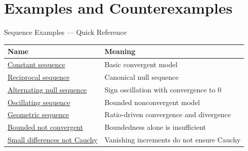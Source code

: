 \section{Examples and Counterexamples}

\begin{toolkitbox}{Sequence Examples --- Quick Reference}
\small
\begin{tabular}{l l}
\toprule
\textbf{Name} & \textbf{Meaning} \\
\midrule
\hyperref[ex:sequence-example-constant]{Constant sequence} & Basic convergent model \\
\hyperref[ex:sequence-example-reciprocal]{Reciprocal sequence} & Canonical null sequence \\
\hyperref[ex:sequence-example-alternating-null]{Alternating null sequence} & Sign oscillation with convergence to \(0\) \\
\hyperref[ex:sequence-example-oscillating]{Oscillating sequence} & Bounded nonconvergent model \\
\hyperref[ex:sequence-example-geometric]{Geometric sequence} & Ratio-driven convergence and divergence \\
\hyperref[ex:sequence-counterexample-bounded-not-convergent]{Bounded not convergent} & Boundedness alone is insufficient \\
\hyperref[ex:sequence-counterexample-successive-differences-not-cauchy]{Small differences not Cauchy} & Vanishing increments do not ensure Cauchy \\
\bottomrule
\end{tabular}
\end{toolkitbox}


